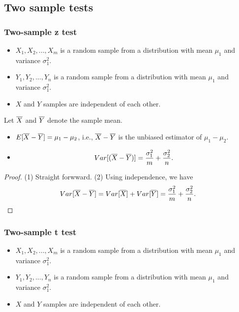 \begin{refsection}
\subsection{Two sample tests}

\subsubsection{Two-sample z test}
\begin{note}\hfill
\begin{itemize}
	\item $X_1,X_2,...,X_m$ is a random sample from a distribution with mean $\mu_1$ and variance $\sigma_1^2$.
	\item $Y_1,Y_2,...,Y_n$ is a random sample from a distribution with mean $\mu_1$ and variance $\sigma_1^2$.
	\item $X$ and $Y$ samples are independent of each other. 
\end{itemize}	
\end{note}


\begin{lemma}\cite[363]{devore2015probability}Let $\overline{X}$ and $\overline{Y}$ denote the sample mean.
\begin{itemize}
	\item $E[\overline{X} - \overline{Y}] = \mu_1 - \mu_2$, i.e., $\overline{X} - \overline{Y}$ is the unbiased estimator of $\mu_1-\mu_2$.
	\item $$Var[(\overline{X} - \overline{Y})]=\frac{\sigma_1^2}{m} + \frac{\sigma_2^2}{n}.$$
\end{itemize}	
\end{lemma}
\begin{proof}
(1) Straight forwward. (2) Using independence, we have
$$Var[\overline{X} - \overline{Y}] = Var[\overline{X}] + Var[\overline{Y}] = \frac{\sigma_1^2}{m} + \frac{\sigma_2^2}{n}.$$

\end{proof}


\subsubsection{Two-sample t test}
\begin{note}\hfill
	\begin{itemize}
		\item $X_1,X_2,...,X_m$ is a random sample from a distribution with mean $\mu_1$ and variance $\sigma_1^2$.
		\item $Y_1,Y_2,...,Y_n$ is a random sample from a distribution with mean $\mu_1$ and variance $\sigma_1^2$.
		\item $X$ and $Y$ samples are independent of each other. 
	\end{itemize}	
\end{note}



\end{refsection}
